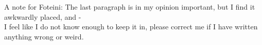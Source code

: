  \colorbox{BurntOrange}{A note for Foteini: The last paragraph is in my opinion important, but I find it awkwardly placed, and} - \\
 \colorbox{BurntOrange}{I feel like I do not know enough to keep it in, please correct me if I have written anything wrong or weird.}

